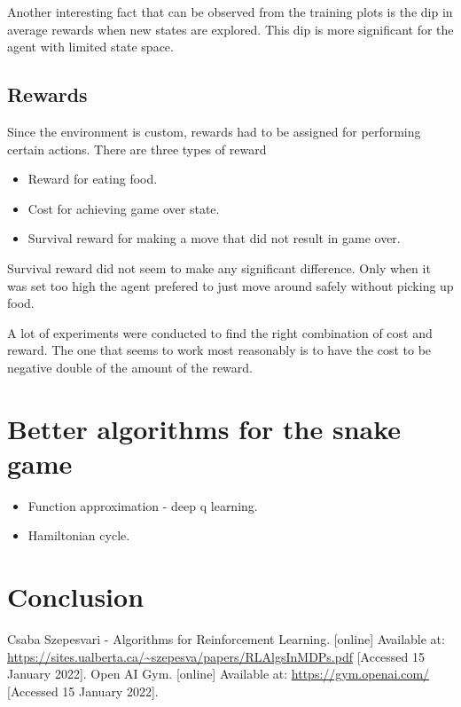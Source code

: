 \documentclass[lettersize,journal]{IEEEtran}
\begin{document}
Another interesting fact that can be observed from the training plots is
the dip in average rewards when new states are explored. This dip
is more significant for the agent with limited state space.


\subsection{Rewards}
Since the environment is custom, rewards had to be assigned for
performing certain actions. There are three types of reward
\begin{itemize}
    \item Reward for eating food.
    \item Cost for achieving game over state.
    \item Survival reward for making a move that did not result
        in game over.
\end{itemize}

Survival reward did not seem to make any significant difference.
Only when it was set too high the agent prefered to just move
around safely without picking up food.

A lot of experiments were conducted to find the right combination
of cost and reward. The one that seems to work most reasonably
is to have the cost to be negative double of the amount of the reward.

\section{Better algorithms for the snake game}
\begin{itemize}
    \item Function approximation - deep q learning.
    \item Hamiltonian cycle.
\end{itemize}

\section{Conclusion}


\begin{thebibliography}{1}
    Csaba Szepesvari - Algorithms for Reinforcement Learning. [online] Available at: \url{https://sites.ualberta.ca/~szepesva/papers/RLAlgsInMDPs.pdf} [Accessed 15 January 2022].
    Open AI Gym. [online] Available at: \url{https://gym.openai.com/} [Accessed 15 January 2022].


\end{thebibliography}
\end{document}
